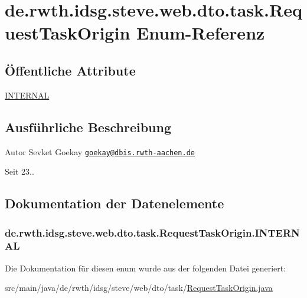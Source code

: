 \hypertarget{enumde_1_1rwth_1_1idsg_1_1steve_1_1web_1_1dto_1_1task_1_1_request_task_origin}{\section{de.\-rwth.\-idsg.\-steve.\-web.\-dto.\-task.\-Request\-Task\-Origin Enum-\/\-Referenz}
\label{enumde_1_1rwth_1_1idsg_1_1steve_1_1web_1_1dto_1_1task_1_1_request_task_origin}
}
\subsection*{Öffentliche Attribute}
\begin{DoxyCompactItemize}
\item 
\hyperlink{enumde_1_1rwth_1_1idsg_1_1steve_1_1web_1_1dto_1_1task_1_1_request_task_origin_a9d491dee4bc48d5484f074c4d2730bfe}{I\-N\-T\-E\-R\-N\-A\-L}
\end{DoxyCompactItemize}


\subsection{Ausführliche Beschreibung}
\begin{DoxyAuthor}{Autor}
Sevket Goekay \href{mailto:goekay@dbis.rwth-aachen.de}{\tt goekay@dbis.\-rwth-\/aachen.\-de} 
\end{DoxyAuthor}
\begin{DoxySince}{Seit}
23.. 
\end{DoxySince}


\subsection{Dokumentation der Datenelemente}
\hypertarget{enumde_1_1rwth_1_1idsg_1_1steve_1_1web_1_1dto_1_1task_1_1_request_task_origin_a9d491dee4bc48d5484f074c4d2730bfe}{
\subsubsection[{I\-N\-T\-E\-R\-N\-A\-L}]{\setlength{\rightskip}{0pt plus 5cm}de.\-rwth.\-idsg.\-steve.\-web.\-dto.\-task.\-Request\-Task\-Origin.\-I\-N\-T\-E\-R\-N\-A\-L}}\label{enumde_1_1rwth_1_1idsg_1_1steve_1_1web_1_1dto_1_1task_1_1_request_task_origin_a9d491dee4bc48d5484f074c4d2730bfe}


Die Dokumentation für diesen enum wurde aus der folgenden Datei generiert\-:\begin{DoxyCompactItemize}
\item 
src/main/java/de/rwth/idsg/steve/web/dto/task/\hyperlink{_request_task_origin_8java}{Request\-Task\-Origin.\-java}\end{DoxyCompactItemize}
